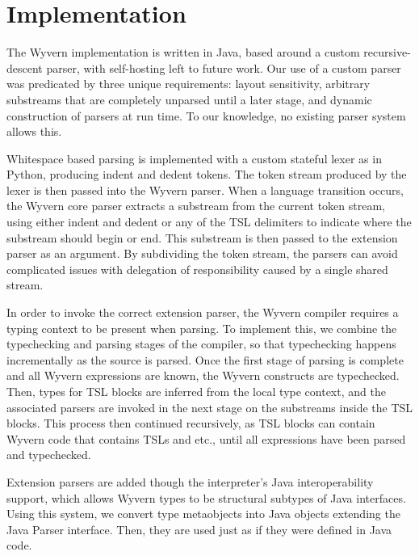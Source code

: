 
\section{Implementation}
\label{s:implementation}
The Wyvern implementation is written in Java, based around a custom recursive-descent parser, with self-hosting left to future work. Our use of a custom parser was predicated by three unique requirements: layout sensitivity, arbitrary substreams that are completely unparsed until a later stage, and dynamic construction of parsers at run time. To our knowledge, no existing parser system allows this.

Whitespace based parsing is implemented with a custom stateful lexer as in Python, producing indent and dedent tokens. The token stream produced by the lexer is then passed into the Wyvern parser. When a language transition occurs, the Wyvern core parser extracts a substream from the current token stream, using either indent and dedent or any of the TSL delimiters to indicate where the substream should begin or end. This substream is then passed to the extension parser as an argument. By subdividing the token stream, the parsers can avoid complicated issues with delegation of responsibility caused by a single shared stream. 

In order to invoke the correct extension parser, the Wyvern compiler requires a typing context to be present when parsing. To implement this, we combine the typechecking and parsing stages of the compiler, so that typechecking happens incrementally as the source is parsed. Once the first stage of parsing is complete and all Wyvern expressions are known, the Wyvern constructs are typechecked. Then, types for TSL blocks are inferred from the local type context, and the associated parsers are invoked in the next stage on the substreams inside the TSL blocks. This process then continued recursively, as TSL blocks can contain Wyvern code that contains TSLs and etc., until all expressions have been parsed and typechecked.

Extension parsers are added though the interpreter's Java interoperability support, which allows Wyvern types to be structural subtypes of Java interfaces. Using this system, we convert type metaobjects into Java objects extending the Java Parser interface. Then, they are used just as if they were defined in Java code.